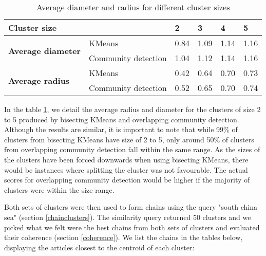 \documentclass[12pt]{article}
\begin{document}
\begin{table}[H]
\centering
\caption{Average diameter and radius for different cluster sizes}
\label{table1}
\begin{tabular}{|l|l|l|l|l|l|}
\hline
\multicolumn{2}{|l|}{{\bf Cluster size}}                      & {\bf 2} & {\bf 3} & {\bf 4} & {\bf 5} \\ \hline
\multirow{2}{*}{{\bf Average diameter}} & KMeans              & 0.84    & 1.09    & 1.14    & 1.16    \\ \cline{2-6} 
                                        & Community detection & 1.04    & 1.12    & 1.14    & 1.16    \\ \hline
\multirow{2}{*}{{\bf Average radius}}           & KMeans              & 0.42    & 0.64    & 0.70    & 0.73    \\ \cline{2-6} 
                                        & Community detection & 0.52    & 0.65    & 0.70    & 0.74    \\ \hline
\end{tabular}
\end{table}

In the table \ref{table1}, we detail the average radius and diameter for the clusters of size 2 to 5 produced by bisecting KMeans and overlapping community detection. Although the results are similar, it is important to note that while 99\% of clusters from bisecting KMeans have size of 2 to 5, only around 50\% of clusters from overlapping community detection fall within the same range. As the sizes of the clusters have been forced downwards when using bisecting KMeans, there would be instances where splitting the cluster was not favourable. The actual scores for overlapping community detection would be higher if the majority of clusters were within the size range.

Both sets of clusters were then used to form chains using the query "south china sea" (section \ref{chainclusters}). The similarity query returned 50 clusters and we picked what we felt were the best chains from both sets of clusters and evaluated their coherence (section \ref{coherence}). We list the chains in the tables below, displaying the articles closest to the centroid of each cluster:
\end{document}
